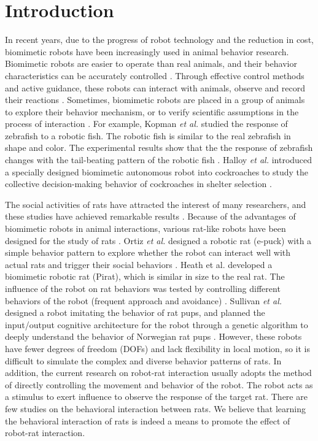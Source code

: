 \section{Introduction}
In recent years, due to the progress of robot technology and the reduction in cost, biomimetic robots have been increasingly used in animal behavior research. Biomimetic robots are easier to operate than real animals, and their behavior characteristics can be accurately controlled \cite{abdai_poking_the_futhre, yeager_new_tech}. Through effective control methods and active guidance, these robots can interact with animals, observe and record their reactions \cite{son_entice_insect,Taylor2008frogs-17969,kopman_closed_loop_zebrafish,partan_wild_tree,5650930}. Sometimes, biomimetic robots are placed in a group of animals to explore their behavior mechanism, or to verify scientific assumptions in the process of interaction \cite{doi:10.1126science.1144259,ward_quorum,gribovskiy_mobile_robot,faria_novel_method}. For example, Kopman \textit{et al.} studied the response of zebrafish to a robotic fish. The robotic fish is similar to the real zebrafish in shape and color. The experimental results show that the the response of zebrafish changes with the tail-beating pattern of the robotic fish \cite{kopman_closed_loop_zebrafish}. Halloy \textit{et al.} introduced a specially designed biomimetic autonomous robot into cockroaches to study the collective decision-making behavior of cockroaches in shelter selection \cite{doi:10.1126science.1144259}.

The social activities of rats have attracted the interest of many researchers, and these studies have achieved remarkable results \cite{fleliz_bidirectional_modulation,weiss_shall_two_walk}. Because of the advantages of biomimetic robots in animal interactions, various rat-like robots have been designed for the study of rats \cite{Lucas2018DesignOA,Shi_bb_2013,Shi_bb_2015,shi-gao-tro-2022}. Ortiz \textit{et al.} designed a robotic rat (e-puck) with a simple behavior pattern to explore whether the robot can interact well with actual rats and trigger their social behaviors \cite{Rusalky-sit}. Heath et al. developed a biomimetic robotic rat (Pirat), which is similar in size to the real rat. The influence of the robot on rat behaviors was tested by controlling different behaviors of the robot (frequent approach and avoidance) \cite{pirat}. Sullivan \textit{et al.} designed a robot imitating the behavior of rat pups, and planned the input/output cognitive architecture for the robot through a genetic algorithm to deeply understand the behavior of Norwegian rat pups \cite{sullivan-arl-2015}. However, these robots have fewer degrees of freedom (DOFs) and lack flexibility in local motion, so it is difficult to simulate the complex and diverse behavior patterns of rats. In addition, the current research on robot-rat interaction usually adopts the method of directly controlling the movement and behavior of the robot. The robot acts as a stimulus to exert influence to observe the response of the target rat. There are few studies on the behavioral interaction between rats. We believe that learning the behavioral interaction of rats is indeed a means to promote the effect of robot-rat interaction.

